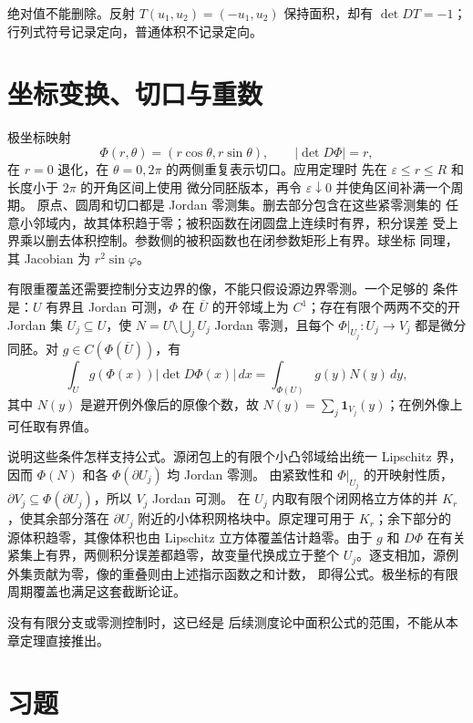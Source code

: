 绝对值不能删除。反射 \(T(u_1,u_2)=(-u_1,u_2)\) 保持面积，却有
\(\det DT=-1\)；行列式符号记录定向，普通体积不记录定向。

\section{坐标变换、切口与重数}

极坐标映射
\[
 \Phi(r,\theta)=(r\cos\theta,r\sin\theta),
 \qquad |\det D\Phi|=r,
\]
在 \(r=0\) 退化，在 \(\theta=0,2\pi\) 的两侧重复表示切口。应用定理时
先在 \(\varepsilon\le r\le R\) 和长度小于 \(2\pi\) 的开角区间上使用
微分同胚版本，再令 \(\varepsilon\downarrow0\) 并使角区间补满一个周期。
原点、圆周和切口都是 Jordan 零测集。删去部分包含在这些紧零测集的
任意小邻域内，故其体积趋于零；被积函数在闭圆盘上连续时有界，积分误差
受上界乘以删去体积控制。参数侧的被积函数也在闭参数矩形上有界。球坐标
同理，其
Jacobian 为 \(r^2\sin\varphi\)。

有限重覆盖还需要控制分支边界的像，不能只假设源边界零测。一个足够的
条件是：$U$ 有界且 Jordan 可测，$\Phi$ 在 $\overline U$ 的开邻域上为
$C^1$；存在有限个两两不交的开 Jordan 集 $U_j\subseteq U$，使
$N=U\setminus\bigcup_jU_j$ Jordan 零测，且每个
$\Phi|_{U_j}:U_j\to V_j$ 都是微分同胚。对
$g\in C(\Phi(\overline U))$，有
\[
 \int_U g(\Phi(x))|\det D\Phi(x)|\,dx
 =\int_{\Phi(U)}g(y)N(y)\,dy,
\]
其中 $N(y)$ 是避开例外像后的原像个数，故
$N(y)=\sum_j\mathbf1_{V_j}(y)$；在例外像上可任取有界值。

说明这些条件怎样支持公式。源闭包上的有限个小凸邻域给出统一 Lipschitz
界，因而 $\Phi(N)$ 和各 $\Phi(\partial U_j)$ 均 Jordan 零测。
由紧致性和 $\Phi|_{U_j}$ 的开映射性质，
$\partial V_j\subseteq\Phi(\partial U_j)$，所以 $V_j$ Jordan 可测。
在 $U_j$ 内取有限个闭网格立方体的并 $K_r$，使其余部分落在
$\partial U_j$ 附近的小体积网格块中。原定理可用于 $K_r$；余下部分的
源体积趋零，其像体积也由 Lipschitz 立方体覆盖估计趋零。由于 $g$ 和
$D\Phi$ 在有关紧集上有界，两侧积分误差都趋零，故变量代换成立于整个
$U_j$。逐支相加，源例外集贡献为零，像的重叠则由上述指示函数之和计数，
即得公式。极坐标的有限周期覆盖也满足这套截断论证。

没有有限分支或零测控制时，这已经是
后续测度论中面积公式的范围，不能从本章定理直接推出。

\section*{习题}

